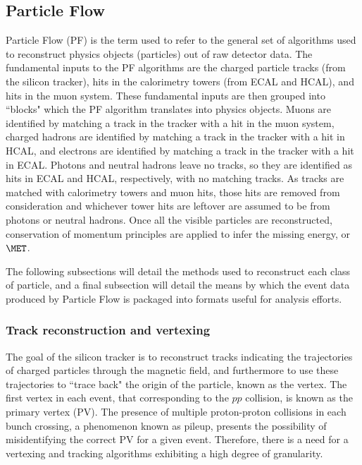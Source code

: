 \subsection{Particle Flow}

Particle Flow (PF) is the term used to refer to the general set of algorithms used to reconstruct physics objects (particles) out of raw detector data. The fundamental inputs to the PF algorithms are the charged particle tracks (from the silicon tracker), hits in the calorimetry towers (from ECAL and HCAL), and hits in the muon system. These fundamental inputs are then grouped into ``blocks" which the PF algorithm translates into physics objects. Muons are identified by matching a track in the tracker with a hit in the muon system, charged hadrons are identified by matching a track in the tracker with a hit in HCAL, and electrons are identified by matching a track in the tracker with a hit in ECAL. Photons and neutral hadrons leave no tracks, so they are identified as hits in ECAL and HCAL, respectively, with no matching tracks. As tracks are matched with calorimetry towers and muon hits, those hits are removed from consideration and whichever tower hits are leftover are assumed to be from photons or neutral hadrons. Once all the visible particles are reconstructed, conservation of momentum principles are applied to infer the missing energy, or $\MET$.

The following subsections will detail the methods used to reconstruct each class of particle, and a final subsection will detail the means by which the event data produced by Particle Flow is packaged into formats useful for analysis efforts.

\subsubsection{Track reconstruction and vertexing}

The goal of the silicon tracker is to reconstruct tracks indicating the trajectories of charged particles through the magnetic field, and furthermore to use these trajectories to ``trace back" the origin of the particle, known as the vertex. The first vertex in each event, that corresponding to the $pp$ collision, is known as the primary vertex (PV). The presence of multiple proton-proton collisions in each bunch crossing, a phenomenon known as pileup, presents the possibility of misidentifying the correct PV for a given event. Therefore, there is a need for a vertexing and tracking algorithms exhibiting a high degree of granularity.

